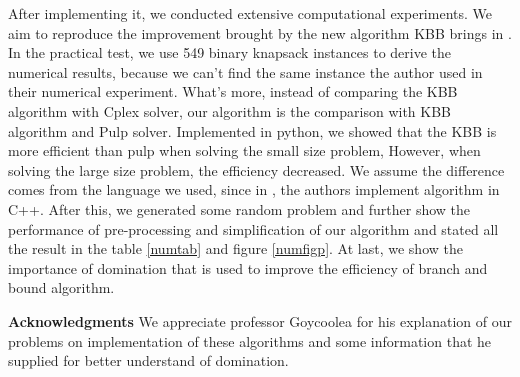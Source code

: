 \documentclass[a4paper,11pt]{article}
\begin{document}
After implementing it, we conducted extensive computational experiments. We aim to reproduce the improvement brought by the new algorithm KBB
brings in \cite{fukasawa2011exact}. In the practical test, we use 549 binary knapsack instances to derive the numerical results, because we can't find the same instance the author used in their numerical experiment. What's more, instead of comparing the KBB algorithm with Cplex solver, our algorithm is the comparison with KBB algorithm and Pulp solver. Implemented in python, we showed that the KBB is more efficient than pulp when solving the small size problem, However, when solving the large size problem, the efficiency decreased. We assume the difference comes from the language we used, since in \cite{fukasawa2011exact}, the authors implement algorithm in C++.  After this, we generated some random problem and further show the performance of pre-processing and simplification of our algorithm and stated all the result in the table \ref{numtab} and figure \ref{numfigp}. At last, we show the importance of domination that is used to improve the efficiency of branch and bound algorithm.

\textbf{Acknowledgments} We appreciate professor Goycoolea for his explanation of our problems on implementation of these algorithms and some information that he supplied for better understand of domination.  

\newpage
 

 
\end{document}
